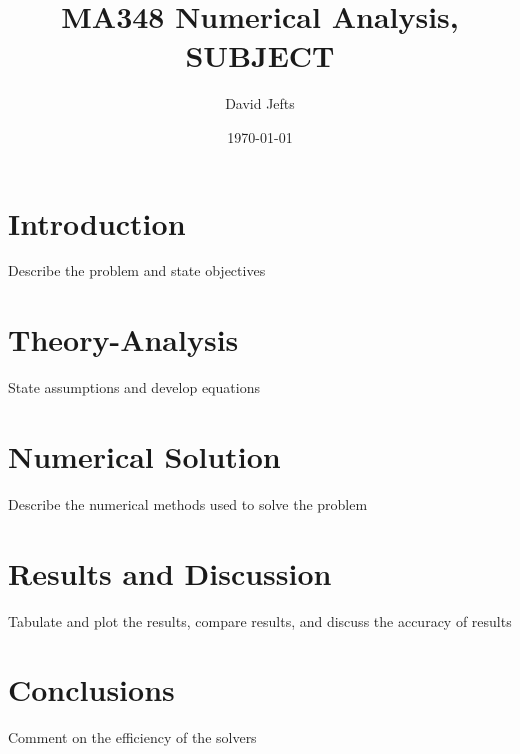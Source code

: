 \documentclass[12pt, letterpaper]{article}
\begin{document}
\setcounter{secnumdepth}{-1}

\title{MA348 Numerical Analysis, SUBJECT}
\author{David Jefts}
\date{\today}
\begin{titlepage}
	\centering
	\maketitle
	\centering
	\hfill
	\vfill
\end{titlepage}

\setlength{\voffset}{-0.5in}
\setlength{\headsep}{10pt}

\section{Introduction}
	Describe the problem and state objectives

\section{Theory-Analysis}
State assumptions and develop equations

\section{Numerical Solution}
	Describe the numerical methods used to solve the problem

\section{Results and Discussion}
	Tabulate and plot the results, compare results, and discuss the accuracy of results
	
\section{Conclusions}
	Comment on the efficiency of the solvers
\end{document}
